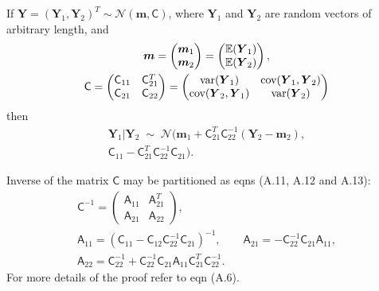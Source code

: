 \documentclass[twocolumn]{svjour3}          %
\newcommand{\bm}[1]{\boldsymbol{#1}}
\newcommand{\Ex}{\mathbb{E}}
\newcommand{\vm}{\bm{m}}
\newcommand{\vY}{\bm{Y}}
\newcommand{\mA}{\mathsf{A}}
\newcommand{\mC}{\mathsf{C}}
\newcommand{\cov}{{\textup{cov}}}
\newcommand{\var}{{\textup{var}}}
\newcommand{\calN}{\mathcal{N}}
\begin{document}
\begin{lemma} \label{thrm:condDist} If $\vY = (\vY_1, \vY_2)^T \sim \calN (\vm,\mC)$, where $\vY_1$ and $\vY_2$ are random vectors of arbitrary length, and 
	\begin{gather*}
	\vm = \begin{pmatrix} \vm_1 \\ \vm_2 \end{pmatrix} = \begin{pmatrix} \Ex(\vY_1) \\ \Ex(\vY_2) \end{pmatrix}, \\
	\mC = \begin{pmatrix}
	\mC_{11} & \mC_{21}^T \\ 	\mC_{21} & \mC_{22}
	\end{pmatrix} =
	\begin{pmatrix}
	\var(\vY_{1}) & \cov(\vY_{1}, \vY_2) \\ 	\cov(\vY_2,\vY_{1}) & \var(\vY_{2})
	\end{pmatrix} 
	\end{gather*}
	then 
	\begin{multline*}
	\vY_1 \vert \vY_2 \; \sim \; \calN \bigl(\vm_1 + \mC_{21}^T \mC_{22}^{-1}(\vY_2 - \vm_2), \\ \mC_{11} - \mC_{21}^T \mC_{22}^{-1} \mC_{21} \bigr).
	\end{multline*}
	
	Inverse of the matrix $\mC$ may be partitioned as \cite{RasWil06a} eqns (A.11, A.12 and A.13):
\begin{gather*}
\mC^{-1} = \begin{pmatrix} \mA_{11} & \mA_{21}^T \\ \mA_{21} & \mA_{22} \end{pmatrix}, \\
\mA_{11} = (\mC_{11} - \mC_{12} \mC_{22}^{-1} \mC_{21})^{-1}, \qquad 
\mA_{21} = -  \mC_{22}^{-1} \mC_{21} \mA_{11}, \\ 
\mA_{22} = \mC_{22}^{-1} + \mC_{22}^{-1} \mC_{21} \mA_{11} \mC_{21}^T \mC_{22}^{-1}.
\end{gather*}
For more details of the proof refer to \cite{RasWil06a} eqn (A.6).
\end{lemma}
\iffalse
\end{document}
